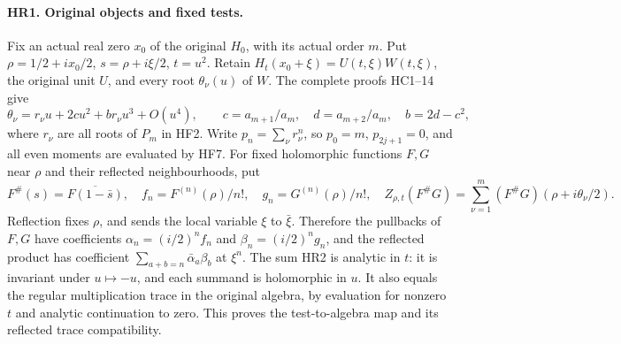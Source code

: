\documentclass[11pt,a4paper]{article}
\theoremstyle{definition}\newtheorem{definition}[theorem]{Definition}
\begin{document}
\paragraph{HR1. Original objects and fixed tests.}
Fix an actual real zero $x_0$ of the original $H_0$, with its actual
order $m$. Put $\rho=1/2+ix_0/2$, $s=\rho+i\xi/2$, $t=u^2$.
Retain $H_t(x_0+\xi)=U(t,\xi)W(t,\xi)$, the original unit $U$,
and every root $\theta_\nu(u)$ of $W$. The complete proofs HC1--14
give
\[
 \theta_\nu=r_\nu u+2cu^2+b r_\nu u^3+O(u^4),\qquad
 c=a_{m+1}/a_m,\quad d=a_{m+2}/a_m,\quad b=2d-c^2,
 \tag{HR1}
\]
where $r_\nu$ are all roots of $P_m$ in HF2. Write
$p_n=\sum_\nu r_\nu^n$, so $p_0=m$, $p_{2j+1}=0$,
and all even moments are evaluated by HF7.
For fixed holomorphic functions $F,G$ near $\rho$ and their
reflected neighbourhoods, put
\[
 F^\#(s)=\overline{F(1-\bar s)},\quad
 f_n=F^{(n)}(\rho)/n!,\quad g_n=G^{(n)}(\rho)/n!,
 \quad
 Z_{\rho,t}(F^\#G)=\sum_{\nu=1}^m
   (F^\#G)(\rho+i\theta_\nu/2).
 \tag{HR2}
\]
Reflection fixes $\rho$, and sends the local variable
$\xi$ to $\bar\xi$. Therefore the pullbacks of $F,G$ have
coefficients $\alpha_n=(i/2)^n f_n$ and
$\beta_n=(i/2)^n g_n$, and the reflected product has coefficient
$\sum_{a+b=n}\bar\alpha_a\beta_b$ at $\xi^n$.
The sum HR2 is analytic in $t$: it is invariant under $u\mapsto-u$,
and each summand is holomorphic in $u$. It also equals the regular
multiplication trace in the original algebra, by evaluation for
nonzero $t$ and analytic continuation to zero. This proves the
test-to-algebra map and its reflected trace compatibility.
\end{document}
